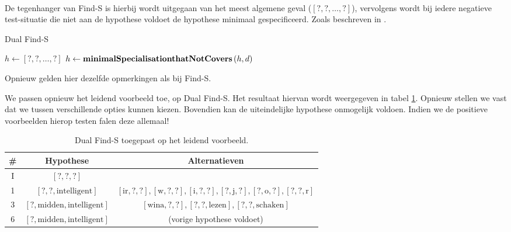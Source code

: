 \paragraph{}
De tegenhanger van Find-S is  hierbij wordt uitgegaan van het meest algemene geval ($\left[\mbox{?},\mbox{?},\ldots,\mbox{?}\right]$), vervolgens wordt bij iedere negatieve test-situatie die niet aan de hypothese voldoet de hypothese minimaal gespecificeerd. Zoals beschreven in .
\begin{algorithm}[htb]                      %
\caption{Dual Find-S}          %
\label{alg:dualFindS}                           %
\begin{algorithmic}[1]                    %
\STATE $h\leftarrow\left[\mbox{?},\mbox{?},\ldots,\mbox{?}\right]$
\STATE $h\leftarrow\mbox{\bf minimalSpecialisationthatNotCovers}\left( h,d \right)$
\ENDIF
\ENDFOR
\end{algorithmic}
\end{algorithm}
Opnieuw gelden hier dezelfde opmerkingen als bij Find-S.
\begin{leftbar}
We passen opnieuw het leidend voorbeeld toe, op Dual Find-S. Het resultaat hiervan wordt weergegeven in tabel \ref{tbl:sollicitatieDualFindS}. Opnieuw stellen we vast dat we tussen verschillende opties kunnen kiezen. Bovendien kan de uiteindelijke hypothese onmogelijk voldoen. Indien we de positieve voorbeelden hierop testen falen deze allemaal!
\end{leftbar}
\begin{table}[htb]
\centering
\begin{tabular}{c|c|c}
\#&Hypothese&Alternatieven\\
\hline
I&$\left[?,?,?\right]$&\\
1&$\left[?,?,\mbox{intelligent}\right]$&$\left[\mbox{ir},?,?\right],\left[\mbox{w},?,?\right],\left[\mbox{i},?,?\right],\left[?,\mbox{j},?\right],\left[?,\mbox{o},?\right],\left[?,?,\mbox{r}\right]$\\%
3&$\left[?,\mbox{midden},\mbox{intelligent}\right]$&$\left[\mbox{wina},?,?\right],\left[?,?,\mbox{lezen}\right],\left[?,?,\mbox{schaken}\right]$\\
6&$\left[?,\mbox{midden},\mbox{intelligent}\right]$&(vorige hypothese voldoet)
\end{tabular}
\caption{Dual Find-S toegepast op het leidend voorbeeld.}
\label{tbl:sollicitatieDualFindS}
\end{table}
